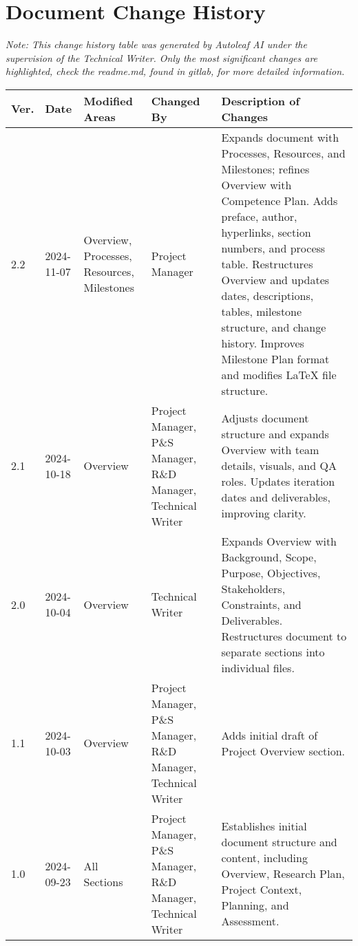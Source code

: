 \section{Document Change History}

\begin{center}
\small\textit{Note: This change history table was generated by Autoleaf AI under the supervision of the Technical Writer. Only the most significant changes are highlighted, check the readme.md, found in gitlab, for more detailed information.}

\vspace{0.5cm}

\begin{tabular}{|p{}|p{}|p{}|p{}|p{}|}
\hline
\textbf{Ver.} & \textbf{Date} & \textbf{Modified Areas} & \textbf{Changed By} & \textbf{Description of Changes} \\
\hline
2.2 & 2024-11-07 & Overview, Processes, Resources, Milestones & Project Manager & Expands document with Processes, Resources, and Milestones; refines Overview with Competence Plan. Adds preface, author, hyperlinks, section numbers, and process table. Restructures Overview and updates dates, descriptions, tables, milestone structure, and change history. Improves Milestone Plan format and modifies LaTeX file structure. \\
\hline
2.1 & 2024-10-18 & Overview & Project Manager, P\&S Manager, R\&D Manager, Technical Writer & Adjusts document structure and expands Overview with team details, visuals, and QA roles. Updates iteration dates and deliverables, improving clarity. \\
\hline
2.0 & 2024-10-04 & Overview & Technical Writer & Expands Overview with Background, Scope, Purpose, Objectives, Stakeholders, Constraints, and Deliverables. Restructures document to separate sections into individual files. \\
\hline
1.1 & 2024-10-03 & Overview & Project Manager, P\&S Manager, R\&D Manager, Technical Writer & Adds initial draft of Project Overview section. \\
\hline
1.0 & 2024-09-23 & All Sections & Project Manager, P\&S Manager, R\&D Manager, Technical Writer & Establishes initial document structure and content, including Overview, Research Plan, Project Context, Planning, and Assessment. \\
\hline
\end{tabular}
\end{center}

\vspace{1cm}
